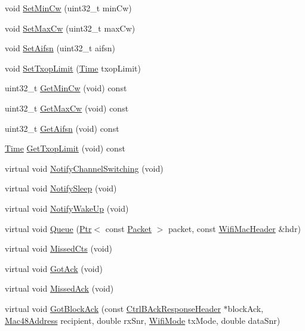 \begin{DoxyCompactItemize}
\item 
void \hyperlink{classns3_1_1DcaTxop_a97542c610e1f9bcf5b433dd9cdbb1660}{Set\+Min\+Cw} (uint32\+\_\+t min\+Cw)
\item 
void \hyperlink{classns3_1_1DcaTxop_aa6ede533b8d2d4299930f7766c946ba3}{Set\+Max\+Cw} (uint32\+\_\+t max\+Cw)
\item 
void \hyperlink{classns3_1_1DcaTxop_a0d0de3ac05a42f7ea809d785c13ee975}{Set\+Aifsn} (uint32\+\_\+t aifsn)
\item 
void \hyperlink{classns3_1_1DcaTxop_a0f4815d1c66ef7abb71d08b58dcf5787}{Set\+Txop\+Limit} (\hyperlink{classns3_1_1Time}{Time} txop\+Limit)
\item 
uint32\+\_\+t \hyperlink{classns3_1_1DcaTxop_aa3d8596629fbe818547830ea05d71508}{Get\+Min\+Cw} (void) const 
\item 
uint32\+\_\+t \hyperlink{classns3_1_1DcaTxop_ac476cb39043eb33877fa8b9d6007db0a}{Get\+Max\+Cw} (void) const 
\item 
uint32\+\_\+t \hyperlink{classns3_1_1DcaTxop_a24cca5cd75c506940a47f8e4cf87c2c1}{Get\+Aifsn} (void) const 
\item 
\hyperlink{classns3_1_1Time}{Time} \hyperlink{classns3_1_1DcaTxop_a0ccd95b29f66c25d0c1baf5437f90fcf}{Get\+Txop\+Limit} (void) const 
\item 
virtual void \hyperlink{classns3_1_1DcaTxop_a85819a15117b046eeb612478ee3f88db}{Notify\+Channel\+Switching} (void)
\item 
virtual void \hyperlink{classns3_1_1DcaTxop_abeb5f09aec7f951493efe41f7f296b9b}{Notify\+Sleep} (void)
\item 
virtual void \hyperlink{classns3_1_1DcaTxop_ae5e42a39be0fc0fd8796df97f7bd19b6}{Notify\+Wake\+Up} (void)
\item 
virtual void \hyperlink{classns3_1_1DcaTxop_a81822147a9d3f8db1759e4cb5d568f7c}{Queue} (\hyperlink{classns3_1_1Ptr}{Ptr}$<$ const \hyperlink{classns3_1_1Packet}{Packet} $>$ packet, const \hyperlink{classns3_1_1WifiMacHeader}{Wifi\+Mac\+Header} \&hdr)
\item 
virtual void \hyperlink{classns3_1_1DcaTxop_af27914f05cda12aa0fc6245f054c45bd}{Missed\+Cts} (void)
\item 
virtual void \hyperlink{classns3_1_1DcaTxop_ae886b71f06cb39fd4affb03576fd3701}{Got\+Ack} (void)
\item 
virtual void \hyperlink{classns3_1_1DcaTxop_ad3e81e84ae17a53ba12407f5954ca96a}{Missed\+Ack} (void)
\item 
virtual void \hyperlink{classns3_1_1DcaTxop_ab0ee6641943fe3d12058c538e4f57a70}{Got\+Block\+Ack} (const \hyperlink{classns3_1_1CtrlBAckResponseHeader}{Ctrl\+B\+Ack\+Response\+Header} $\ast$block\+Ack, \hyperlink{classns3_1_1Mac48Address}{Mac48\+Address} recipient, double rx\+Snr, \hyperlink{classns3_1_1WifiMode}{Wifi\+Mode} tx\+Mode, double data\+Snr)

\end{DoxyCompactItemize}
